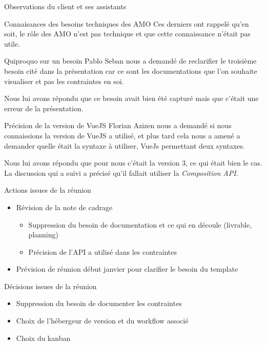 \documentclass[]{article}
\begin{document}
\begin{section}{Observations du client et ses assistants}
\begin{subsection}{Connaisances des besoins techniques des AMO}
            Ces derniers ont rappelé qu'en soit, le rôle des AMO n'est pas technique et que cette connaissance n'était pas 
            utile.
        \end{subsection}

        \begin{subsection}{Quiproquo sur un besoin}
            Pablo Seban nous a demandé de reclarifier le troisième besoin cité dans la présentation car ce sont les 
            documentations que l'on souhaite visualiser et pas les contraintes en soi.

            Nous lui avons répondu que ce besoin avait bien été capturé mais que c'était une erreur de la présentation.
        \end{subsection}

        \begin{subsection}{Précision de la version de VueJS}
            Florian Azizen nous a demandé si nous connaissions la version de VueJS a utilisé, et plus tard cela nous a amené a
            demander quelle était la syntaxe à utiliser, VueJs permettant deux syntaxes.

            Nous lui avons répondu que pour nous c'était la version 3, ce qui était bien le cas. La discussion qui a suivi a 
            précisé qu'il fallait utiliser la \emph{Composition API}.
        \end{subsection}

    \end{section}

    \begin{section}{Actions issues de la réunion}
        \begin{itemize}
            \item Révision de la note de cadrage
            \begin{itemize}
                \item Suppression du besoin de documentation et ce qui en découle (livrable, planning)
                \item Précision de l'API a utilisé dans les contraintes
            \end{itemize}

            \item Prévision de réunion début janvier pour clarifier le besoin du template
        \end{itemize}
        
    \end{section}

    \begin{section}{Décisions issues de la réunion}
        \begin{itemize}
            \item Suppression du besoin de documenter les contraintes
            \item Choix de l'hébergeur de version et du workflow associé
            \item Choix du kanban
        \end{itemize}
        
    \end{section}
\end{document}

